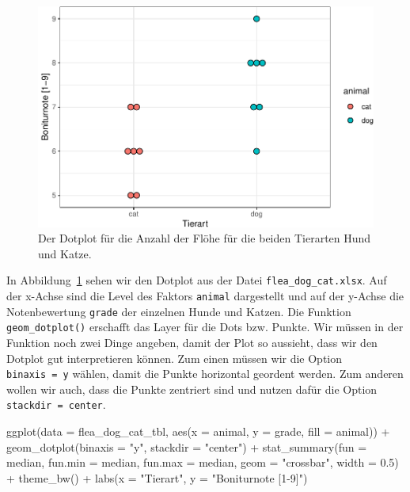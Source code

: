 \documentclass[
  letterpaper,
]{scrbook}
\newenvironment{Shaded}{\begin{snugshade}}{\end{snugshade}}
\newcommand{\AttributeTok}[1]{\textcolor[rgb]{0.40,0.45,0.13}{#1}}
\newcommand{\FloatTok}[1]{\textcolor[rgb]{0.68,0.00,0.00}{#1}}
\newcommand{\FunctionTok}[1]{\textcolor[rgb]{0.28,0.35,0.67}{#1}}
\newcommand{\NormalTok}[1]{\textcolor[rgb]{0.00,0.23,0.31}{#1}}
\newcommand{\SpecialCharTok}[1]{\textcolor[rgb]{0.37,0.37,0.37}{#1}}
\newcommand{\StringTok}[1]{\textcolor[rgb]{0.13,0.47,0.30}{#1}}
\begin{document}
\begin{figure}[H]

{\centering \includegraphics{./eda-ggplot_files/figure-pdf/fig-dotplot-flea-eda-0-1.pdf}

}

\caption{\label{fig-dotplot-flea-eda-0}Der Dotplot für die Anzahl der
Flöhe für die beiden Tierarten Hund und Katze.}

\end{figure}

In Abbildung~\ref{fig-dotplot-flea-eda-0} sehen wir den Dotplot aus der
Datei \texttt{flea\_dog\_cat.xlsx}. Auf der x-Achse sind die Level des
Faktors \texttt{animal} dargestellt und auf der y-Achse die
Notenbewertung \texttt{grade} der einzelnen Hunde und Katzen. Die
Funktion \texttt{geom\_dotplot()} erschafft das Layer für die Dots bzw.
Punkte. Wir müssen in der Funktion noch zwei Dinge angeben, damit der
Plot so aussieht, dass wir den Dotplot gut interpretieren können. Zum
einen müssen wir die Option \texttt{binaxis\ =\ y} wählen, damit die
Punkte horizontal geordent werden. Zum anderen wollen wir auch, dass die
Punkte zentriert sind und nutzen dafür die Option
\texttt{stackdir\ =\ center}.

\begin{Shaded}
\begin{Highlighting}[]
\FunctionTok{ggplot}\NormalTok{(}\AttributeTok{data =}\NormalTok{ flea\_dog\_cat\_tbl, }\FunctionTok{aes}\NormalTok{(}\AttributeTok{x =}\NormalTok{ animal, }\AttributeTok{y =}\NormalTok{ grade,}
                            \AttributeTok{fill =}\NormalTok{ animal)) }\SpecialCharTok{+}
  \FunctionTok{geom\_dotplot}\NormalTok{(}\AttributeTok{binaxis =} \StringTok{"y"}\NormalTok{, }\AttributeTok{stackdir =} \StringTok{"center"}\NormalTok{) }\SpecialCharTok{+}
  \FunctionTok{stat\_summary}\NormalTok{(}\AttributeTok{fun =}\NormalTok{ median, }\AttributeTok{fun.min =}\NormalTok{ median, }\AttributeTok{fun.max =}\NormalTok{ median,}
               \AttributeTok{geom =} \StringTok{"crossbar"}\NormalTok{, }\AttributeTok{width =} \FloatTok{0.5}\NormalTok{) }\SpecialCharTok{+}
  \FunctionTok{theme\_bw}\NormalTok{() }\SpecialCharTok{+}
  \FunctionTok{labs}\NormalTok{(}\AttributeTok{x =} \StringTok{"Tierart"}\NormalTok{, }\AttributeTok{y =} \StringTok{"Boniturnote [1{-}9]"}\NormalTok{) }
\end{Highlighting}
\end{Shaded}
\end{document}
